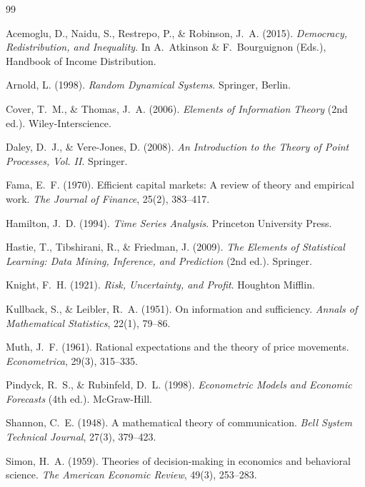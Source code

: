 \documentclass[12pt, a4paper, titlepage]{report}
\theoremstyle{definition}
\theoremstyle{remark}
\begin{document}

\begin{thebibliography}{99}

Acemoglu, D., Naidu, S., Restrepo, P., \& Robinson, J.~A. (2015).
\newblock \textit{Democracy, Redistribution, and Inequality}.
\newblock In A.~Atkinson \& F.~Bourguignon (Eds.), Handbook of Income Distribution.

Arnold, L. (1998).
\newblock \textit{Random Dynamical Systems}.
\newblock Springer, Berlin.

Cover, T.~M., \& Thomas, J.~A. (2006).
\newblock \textit{Elements of Information Theory} (2nd ed.).
\newblock Wiley-Interscience.

Daley, D.~J., \& Vere-Jones, D. (2008).
\newblock \textit{An Introduction to the Theory of Point Processes, Vol. II}.
\newblock Springer.

Fama, E.~F. (1970).
\newblock Efficient capital markets: A review of theory and empirical work.
\newblock \textit{The Journal of Finance}, 25(2), 383--417.

Hamilton, J.~D. (1994).
\newblock \textit{Time Series Analysis}.
\newblock Princeton University Press.

Hastie, T., Tibshirani, R., \& Friedman, J. (2009).
\newblock \textit{The Elements of Statistical Learning: Data Mining, Inference, and Prediction} (2nd ed.).
\newblock Springer.

Knight, F.~H. (1921).
\newblock \textit{Risk, Uncertainty, and Profit}.
\newblock Houghton Mifflin.

Kullback, S., \& Leibler, R.~A. (1951).
\newblock On information and sufficiency.
\newblock \textit{Annals of Mathematical Statistics}, 22(1), 79--86.

Muth, J.~F. (1961).
\newblock Rational expectations and the theory of price movements.
\newblock \textit{Econometrica}, 29(3), 315--335.

Pindyck, R.~S., \& Rubinfeld, D.~L. (1998).
\newblock \textit{Econometric Models and Economic Forecasts} (4th ed.).
\newblock McGraw-Hill.

Shannon, C.~E. (1948).
\newblock A mathematical theory of communication.
\newblock \textit{Bell System Technical Journal}, 27(3), 379--423.

Simon, H.~A. (1959).
\newblock Theories of decision-making in economics and behavioral science.
\newblock \textit{The American Economic Review}, 49(3), 253--283.

\end{thebibliography}
\end{document}
